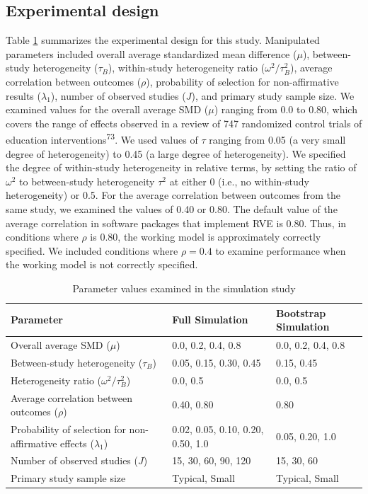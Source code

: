 \documentclass[
  american,
  man, donotrepeattitle,floatsintext]{apa7}
\begin{document}
\subsection{Experimental design}\label{experimental-design}

Table \ref{tab:sim-design} summarizes the experimental design for this study.
Manipulated parameters included overall average standardized mean difference
(\(\mu\)), between-study heterogeneity (\(\tau_B\)), within-study heterogeneity ratio
(\(\omega^2 / \tau_B^2\)), average correlation between outcomes (\(\rho\)),
probability of selection for non-affirmative results (\(\lambda_1\)), number of observed studies (\(J\)), and primary study sample size.
We examined values for the overall average SMD (\(\mu\)) ranging from 0.0 to 0.80, which covers the range of effects observed in a review of 747 randomized control trials of education interventions\textsuperscript{73}.
We used values of \(\tau\) ranging from 0.05 (a very small degree of heterogeneity) to 0.45 (a large degree of heterogeneity).
We specified the degree of within-study heterogeneity in relative terms, by setting the ratio of \(\omega^2\) to between-study heterogeneity \(\tau^2\) at either 0 (i.e., no within-study heterogeneity) or 0.5.
For the average correlation between outcomes from the same study, we examined the values of 0.40 or 0.80. The default value of the average
correlation in software packages that implement RVE is 0.80.
Thus, in conditions where \(\rho\) is 0.80, the working model is approximately correctly specified.
We included conditions where \(\rho = 0.4\) to examine performance when the working model is not correctly specified.

\begin{table}[tb]
\centering
\caption{\label{tab:sim-design}Parameter values examined in the simulation study}
\centering
\begin{tabular}[t]{>{\raggedright\arraybackslash}p{2.5in}ll}
\toprule
Parameter & Full Simulation & Bootstrap Simulation\\
\midrule
Overall average SMD ($\mu$) & 0.0, 0.2, 0.4, 0.8 & 0.0, 0.2, 0.4, 0.8\\
Between-study heterogeneity ($\tau_B$) & 0.05, 0.15, 0.30, 0.45 & 0.15, 0.45\\
Heterogeneity ratio ($\omega^2 / \tau_B^2$) & 0.0, 0.5 & 0.0, 0.5\\
Average correlation between outcomes ($\rho$) & 0.40, 0.80 & 0.80\\
Probability of selection for non-affirmative effects ($\lambda_1$) & 0.02, 0.05, 0.10, 0.20, 0.50, 1.0 & 0.05, 0.20, 1.0\\
\addlinespace
Number of observed studies ($J$) & 15, 30, 60, 90, 120 & 15, 30, 60\\
Primary study sample size & Typical, Small & Typical, Small\\
\bottomrule
\end{tabular}
\end{table}
\end{document}
